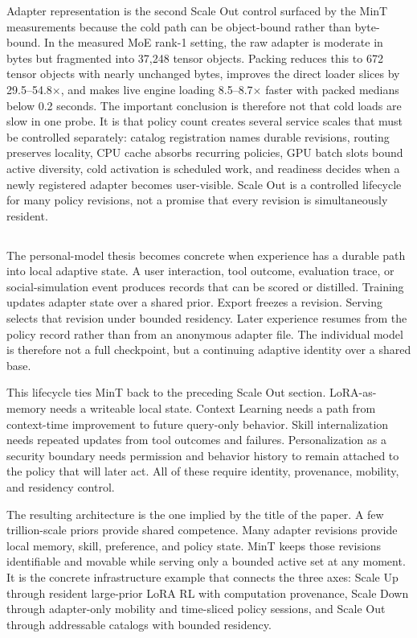 Adapter representation is the second Scale Out control surfaced by the MinT measurements because the cold path can be object-bound rather than byte-bound. In the measured MoE rank-1 setting, the raw adapter is moderate in bytes but fragmented into 37,248 tensor objects. Packing reduces this to 672 tensor objects with nearly unchanged bytes, improves the direct loader slices by 29.5--54.8$\times$, and makes live engine loading 8.5--8.7$\times$ faster with packed medians below 0.2 seconds. The important conclusion is therefore not that cold loads are slow in one probe. It is that policy count creates several service scales that must be controlled separately: catalog registration names durable revisions, routing preserves locality, CPU cache absorbs recurring policies, GPU batch slots bound active diversity, cold activation is scheduled work, and readiness decides when a newly registered adapter becomes user-visible. Scale Out is a controlled lifecycle for many policy revisions, not a promise that every revision is simultaneously resident.

\subsection{}\label{subsec:infra-personal-lifecycle}

The personal-model thesis becomes concrete when experience has a durable path into local adaptive state. A user interaction, tool outcome, evaluation trace, or social-simulation event produces records that can be scored or distilled. Training updates adapter state over a shared prior. Export freezes a revision. Serving selects that revision under bounded residency. Later experience resumes from the policy record rather than from an anonymous adapter file. The individual model is therefore not a full checkpoint, but a continuing adaptive identity over a shared base.

This lifecycle ties MinT back to the preceding Scale Out section. LoRA-as-memory needs a writeable local state. Context Learning needs a path from context-time improvement to future query-only behavior. Skill internalization needs repeated updates from tool outcomes and failures. Personalization as a security boundary needs permission and behavior history to remain attached to the policy that will later act. All of these require identity, provenance, mobility, and residency control.

The resulting architecture is the one implied by the title of the paper. A few trillion-scale priors provide shared competence. Many adapter revisions provide local memory, skill, preference, and policy state. MinT keeps those revisions identifiable and movable while serving only a bounded active set at any moment. It is the concrete infrastructure example that connects the three axes: Scale Up through resident large-prior LoRA RL with computation provenance, Scale Down through adapter-only mobility and time-sliced policy sessions, and Scale Out through addressable catalogs with bounded residency.
